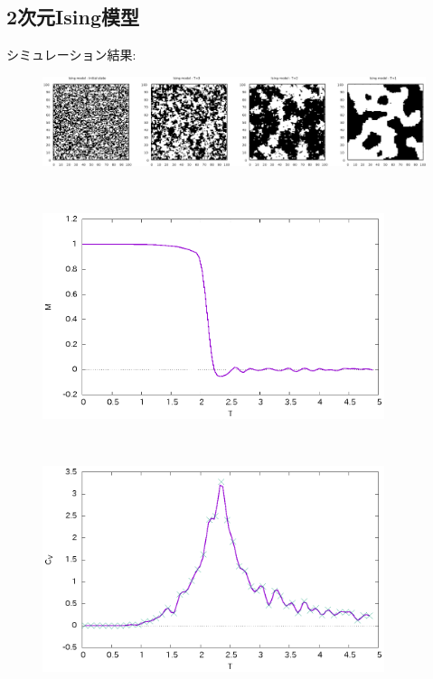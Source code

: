 \documentclass[10.5pt,a4paper]{jreport}
\begin{document}
\subsection{2次元Ising模型}
シミュレーション結果:
\begin{figure}[htbp]
  \begin{center}
    \includegraphics[width = 17cm]{./EPS/spin.eps}
  \end{center}
  \label{fig1}
\end{figure}\\
\begin{figure}[htbp]
  \begin{center}
    \includegraphics[width = 10cm]{./EPS/magnetization.eps}
  \end{center}
  \label{fig2}
\end{figure}\\
\begin{figure}[htbp]
  \begin{center}
    \includegraphics[width = 10cm]{./EPS/specificheat.eps}
  \end{center}
  \label{fig2}
\end{figure}\\
\end{document}
